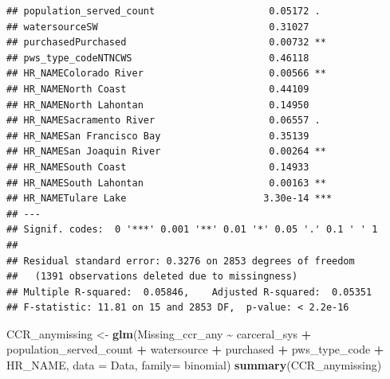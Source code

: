 \documentclass[
]{article}
\newenvironment{Shaded}{\begin{snugshade}}{\end{snugshade}}
\newcommand{\AttributeTok}[1]{\textcolor[rgb]{0.13,0.29,0.53}{#1}}
\newcommand{\FunctionTok}[1]{\textcolor[rgb]{0.13,0.29,0.53}{\textbf{#1}}}
\newcommand{\NormalTok}[1]{#1}
\newcommand{\OtherTok}[1]{\textcolor[rgb]{0.56,0.35,0.01}{#1}}
\newcommand{\SpecialCharTok}[1]{\textcolor[rgb]{0.81,0.36,0.00}{\textbf{#1}}}
\begin{document}
\begin{verbatim}
## population_served_count                    0.05172 .  
## watersourceSW                              0.31027    
## purchasedPurchased                         0.00732 ** 
## pws_type_codeNTNCWS                        0.46118    
## HR_NAMEColorado River                      0.00566 ** 
## HR_NAMENorth Coast                         0.44109    
## HR_NAMENorth Lahontan                      0.14950    
## HR_NAMESacramento River                    0.06557 .  
## HR_NAMESan Francisco Bay                   0.35139    
## HR_NAMESan Joaquin River                   0.00264 ** 
## HR_NAMESouth Coast                         0.14933    
## HR_NAMESouth Lahontan                      0.00163 ** 
## HR_NAMETulare Lake                        3.30e-14 ***
## ---
## Signif. codes:  0 '***' 0.001 '**' 0.01 '*' 0.05 '.' 0.1 ' ' 1
## 
## Residual standard error: 0.3276 on 2853 degrees of freedom
##   (1391 observations deleted due to missingness)
## Multiple R-squared:  0.05846,    Adjusted R-squared:  0.05351 
## F-statistic: 11.81 on 15 and 2853 DF,  p-value: < 2.2e-16
\end{verbatim}

\begin{Shaded}
\begin{Highlighting}[]
\NormalTok{CCR\_anymissing }\OtherTok{\textless{}{-}} \FunctionTok{glm}\NormalTok{(Missing\_ccr\_any }\SpecialCharTok{\textasciitilde{}}\NormalTok{ carceral\_sys }\SpecialCharTok{+}\NormalTok{ population\_served\_count }\SpecialCharTok{+}\NormalTok{ watersource }\SpecialCharTok{+}\NormalTok{ purchased }\SpecialCharTok{+}\NormalTok{ pws\_type\_code }\SpecialCharTok{+}\NormalTok{ HR\_NAME, }\AttributeTok{data =}\NormalTok{ Data, }\AttributeTok{family=}\NormalTok{ binomial)}
\FunctionTok{summary}\NormalTok{(CCR\_anymissing)}
\end{Highlighting}
\end{Shaded}
\end{document}
